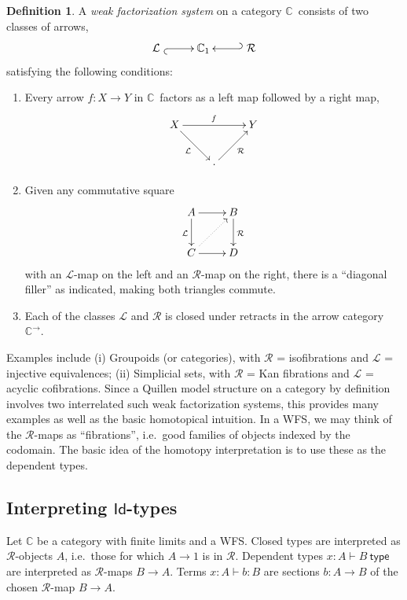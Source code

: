 \documentclass[12pt]{article}
\newcommand{\C}{\ensuremath{\mathbb{C}}}
\renewcommand{\L}{\ensuremath{\mathcal{L}}}
\newcommand{\R}{\ensuremath{\mathcal{R}}}
\newcommand{\arr}{\ensuremath{\rightarrow}}
\newcommand{\type}{\mathsf{type}}
\newcommand{\types}[2]{#1 \vdash #2\ \type}
\newcommand{\terms}[2]{#1 \vdash #2}
\newcommand{\Id}{\ensuremath{\mathsf{Id}}}
\theoremstyle{remark}
\theoremstyle{definition}
\newtheorem{definition}[theorem]{Definition}
\begin{document}
\begin {definition}
A \emph{weak factorization system} on a category \C\ consists of two classes of arrows,
\[
\xymatrix{
\L\ \ar@{_{(}->}[r] & \C_1 & \ar@{_{(}->}[l]\ \R
}
\]
satisfying the following conditions:
\begin{enumerate}
\item Every arrow $f : X\to Y$ in \C\ factors as a left map followed by a right map,
\[
\xymatrix{
 X \ar[rr]^{f} \ar[rd]_{\L} && Y\\
& \cdot \ar[ru]_{\R}  &
}
\]
\item Given any commutative square
\[
\xymatrix{
A \ar[d]_{\L} \ar[r] & B \ar[d]^{\R} \\
C \ar[r] \ar@{..>}[ru] & D
}
\]
with an $\L$-map on the left and an $\R$-map on the right, there is a ``diagonal filler'' as indicated, making both triangles commute.

\item Each of the classes $\L$ and $\R$ is closed under retracts in the arrow category $\C^{\rightarrow}$.
\end{enumerate}
\end{definition}


Examples include (i) Groupoids (or categories), with $\R$ = isofibrations and $\L$ = injective equivalences; (ii) Simplicial sets, with $\R$ = Kan fibrations and $\L$ = acyclic cofibrations.  Since a Quillen model structure on a category by definition involves two interrelated such weak factorization systems, this provides many examples as well as the basic homotopical intuition. In a WFS, we may think of the \R-maps as ``fibrations'', i.e.\ good families of objects indexed by the codomain.  The basic idea of the homotopy interpretation is to use these as the dependent types.

\subsection{Interpreting $\Id$-types}

Let $\C$ be a category with finite limits and a WFS.  Closed types are interpreted as $\R$-objects $A$, i.e.\ those for which $A\arr 1$ is in $\R$.  Dependent types $\types{x:A}{B}$ are interpreted as \R-maps $B\arr A$. Terms $\terms{x:A}{b:B}$ are sections $b: A\arr B$ of the chosen \R-map $B\arr A$.
\end{document}
